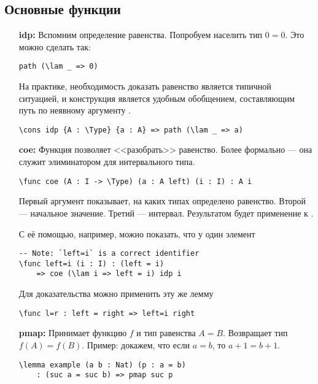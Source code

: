 \subsection{Основные функции}
\begin{itemize}
\item [\bf idp:] Вспомним определение равенства. Попробуем населить тип $0 = 0$. Это можно сделать так:

\begin{verbatim}
path (\lam _ => 0)
\end{verbatim}

На практике, необходимость доказать равенство является типичной ситуацией, и конструкция 
является удобным обобщением, составляющим путь по неявному аргументу .

\begin{verbatim}
\cons idp {A : \Type} {a : A} => path (\lam _ => a)
\end{verbatim}

\item [\bf coe:] Функция  позволяет <<разобрать>> равенство. Более формально --- она служит элиминатором для интервального типа.

\begin{verbatim}
\func coe (A : I -> \Type) (a : A left) (i : I) : A i
\end{verbatim}


Первый аргумент показывает, на каких типах определено равенство. Второй --- начальное значение. Третий --- интервал.
Результатом будет применение  к .

С её помощью, например, можно показать, что у  один элемент

\begin{verbatim}
-- Note: `left=i` is a correct identifier
\func left=i (i : I) : (left = i)
    => coe (\lam i => left = i) idp i
\end{verbatim}

Для доказательства  можно применить эту же лемму

\begin{verbatim}
\func l=r : left = right => left=i right
\end{verbatim}

\item [\bf pmap:] Принимает функцию $f$ и тип равенства $A = B$. Возвращает тип $f(A) = f(B)$.
Пример: докажем, что если $a = b$, то $a+1 = b+1$.
\begin{verbatim}
\lemma example (a b : Nat) (p : a = b) 
    : (suc a = suc b) => pmap suc p
\end{verbatim}


\end{itemize}
